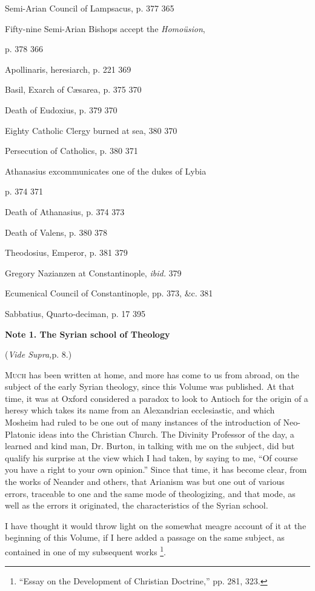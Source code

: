 Semi-Arian Council of Lampsacus, p. 377
365

Fifty-nine Semi-Arian Bishops accept the \emph{Homoüsion},

p. 378
366

Apollinaris, heresiarch, p. 221
369

Basil, Exarch of Cæsarea, p. 375
370

Death of Eudoxius, p. 379
370

Eighty Catholic Clergy burned at sea, 380
370

Persecution of Catholics, p. 380
371

Athanasius excommunicates one of the dukes of
Lybia

p. 374
371

Death of Athanasius, p. 374
373

Death of Valens, p. 380
378

Theodosius, Emperor, p. 381
379

Gregory Nazianzen at Constantinople, \emph{ibid.}
379

Ecumenical Council of Constantinople, pp. 373,
\&c.
381

Sabbatius, Quarto-deciman, p. 17
395


\textbf{Note 1. The Syrian school of Theology}

(\emph{Vide Supra,}p. 8.)

M\textsc{uch} has been written at home, and more has come to us from
abroad, on the subject of the early Syrian theology, since this Volume
was published. At that time, it was at Oxford considered a paradox to
look to Antioch for the origin of a heresy which takes its name from
an Alexandrian ecclesiastic, and which Mosheim had ruled to be one out
of many instances of the introduction of Neo-Platonic ideas into the
Christian Church. The Divinity Professor of the day, a learned and
kind man, Dr. Burton, in talking with me on the subject, did but
qualify his surprise at the view which I had taken, by saying to me,
``Of course you have a right to your own opinion.'' Since that
time, it has become clear, from the works of Neander and others, that
Arianism was but one out of various errors, traceable to one and the
same mode of theologizing, and that mode, as well as the errors it
originated, the characteristics of the Syrian school.

I have thought it would throw light on the somewhat meagre account
of it at the beginning of this Volume, if I here added a passage on
the same subject, as contained in one of my subsequent works \footnote{``Essay on the Development of Christian
Doctrine,'' pp.
281, 323.}.

